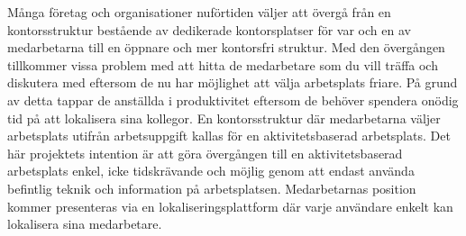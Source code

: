\documentclass[swedish, a4paper,12pt]{article}
\begin{document}
\begin{sammanfattning}
%
%
Många företag och organisationer nuförtiden väljer att övergå från en kontorsstruktur bestående av dedikerade kontorsplatser för var och en av medarbetarna till en öppnare och mer kontorsfri struktur. Med den övergången tillkommer vissa problem med att hitta de medarbetare som du vill träffa och diskutera med eftersom de nu har möjlighet att välja arbetsplats friare. På grund av detta tappar de anställda i produktivitet eftersom de behöver spendera onödig tid på att lokalisera sina kollegor. En kontorsstruktur där medarbetarna väljer arbetsplats utifrån arbetsuppgift kallas för en aktivitetsbaserad arbetsplats. Det här projektets intention är att göra övergången till en aktivitetsbaserad arbetsplats enkel, icke tidskrävande och möjlig genom att endast använda befintlig teknik och information på arbetsplatsen. Medarbetarnas position kommer presenteras via en lokaliseringsplattform där varje användare enkelt kan lokalisera sina medarbetare.

\end{sammanfattning}

\tableofcontents
\end{document}

